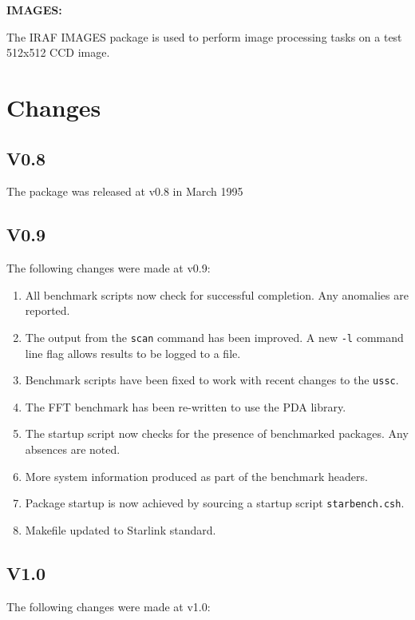 {\bf IMAGES:}

The IRAF IMAGES package is used to perform image processing tasks on
a test 512x512 CCD image. 

\section{Changes}

\subsection{V0.8}

The package was released at v0.8 in March 1995

\subsection{V0.9}

The following changes were made at v0.9:

\begin{enumerate}
\item All benchmark scripts now check for successful completion. Any anomalies
are reported.
\item The output from the {\tt scan} command has been improved. A new {\tt -l}
command line flag allows results to be logged to a file.
\item Benchmark scripts have been fixed to work with recent changes to the
{\tt ussc}.
\item The FFT benchmark has been re-written to use the PDA library.
\item The startup script now checks for the presence of benchmarked
packages. Any absences are noted.
\item More system information produced as part of the benchmark headers.
\item Package startup is now achieved by sourcing a startup script 
{\tt starbench.csh}.
\item Makefile updated to Starlink standard.
\end{enumerate}

\subsection{V1.0}

The following changes were made at v1.0:

